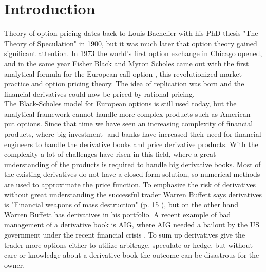 
\chapter{Introduction} %

\label{Chapter1} %

Theory of option pricing dates back to Louis Bachelier with his PhD thesis "The Theory of Speculation" in 1900, but it was much later that option theory gained significant attention. In 1973 the world's first option exchange in Chicago opened, and in the same year Fisher Black and Myron Scholes came out with the first analytical formula for the European call option \parencite{B-S-Paper}, this revolutionized market practice and option pricing theory. The idea of replication was born and the financial derivatives could now be priced by rational pricing. \\

The Black-Scholes model for European options is still used today, but the analytical framework cannot handle more complex products such as American put options. Since that time we have seen an increasing complexity of financial products, where big investment- and banks have increased their need for financial engineers to handle the derivative books and price derivative products. With the complexity a lot of challenges have risen in this field, where a great understanding of the products is required to handle big derivative books. Most of the existing derivatives do not have a closed form solution, so numerical methods are used to approximate the price function. To emphasize the risk of derivatives without great understanding the successful trader Warren Buffett says derivatives is "Financial weapons of mass destruction" (p. 15 \parencite{Buffett02}), but on the other hand Warren Buffett has derivatives in his portfolio. A recent example of bad management of a derivative book is AIG, where AIG needed a bailout by the US government under the recent financial crisis \parencite{McDonaldRobert2015}. To sum up derivatives give the trader more options either to utilize arbitrage, speculate or hedge, but without care or knowledge about a derivative book the outcome can be disastrous for the owner.\\

